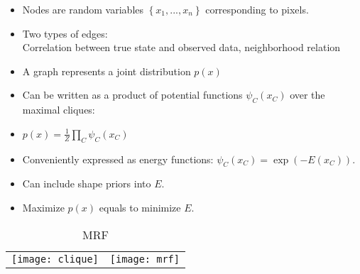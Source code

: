 \documentclass[11pt, a4paper, landscape]{article}
\begin{document}
\NewPage{}
\small
\vfill
\begin{itemize}
\item Nodes are random variables $\left\lbrace x_1, ..., x_n \right\rbrace $ corresponding to pixels.
\item Two types of edges:\\
Correlation between true state and observed data, neighborhood relation
\item A graph represents a joint distribution $p(x)$
\item Can be written as a product of potential functions $\psi_C(x_C)$ over the maximal cliques:
\item[]
	\begin{center}
		$p(x) = \frac{1}{Z} \prod\limits_{C}\psi_C(x_C)$
	\end{center}
\item Conveniently expressed as energy functions: $\psi_C(x_C) = \exp(-E(x_C))$.
\item Can include shape priors into $E$.
\item Maximize $p(x)$ equals to minimize $E$.
\end{itemize}
\begin{table}
  \centering
  \begin{tabular}{@{} M{.5\linewidth} M{.5\linewidth} @{}}
      \texttt{[image: clique]}%
      \caption{Cliques}%
      &
      \texttt{[image: mrf]}%
      \caption{MRF}%
  \end{tabular}
\end{table}
\vfill
\end{document}
